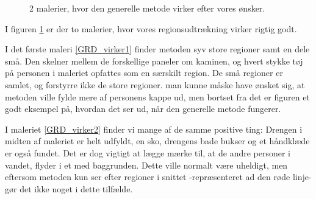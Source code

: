 \begin{figure}[!h]
{        	\label{GRD_virker1}}\hspace{1em}
		\hspace{1em}
        \caption[]{2 malerier, hvor den generelle metode virker efter vores ønsker.}
     \label{generelde_region_detektor_virker}
\end{figure}

I figuren \ref{generelde_region_detektor_virker} er der to malerier, hvor
vores regionsudtrækning virker rigtig godt. 

I det første maleri \ref{GRD_virker1} finder metoden syv store regioner
samt en dele små. Den skelner mellem de forskellige paneler om kaminen,
og hvert stykke tøj på personen i maleriet opfattes som en særskilt
region. De små regioner er samlet, og forstyrre ikke de store regioner.
man kunne måske have ønsket sig, at metoden ville fylde mere af
personens kappe ud, men bortset fra det er figuren et godt eksempel på,
hvordan det ser ud, når den generelle metode fungerer.

I maleriet \ref{GRD_virker2} finder vi mange af de samme positive ting:
Drengen i midten af maleriet er helt udfyldt, en sko, drengens bade
bukser og et håndklæde er også fundet. Det er dog vigtigt at lægge mærke
til, at de andre personer i vandet, flyder i et med baggrunden. Dette
ville normalt være uheldigt, men eftersom metoden kun ser efter regioner
i snittet -repræsenteret ad den røde linje- gør det ikke noget i dette
tilfælde.

